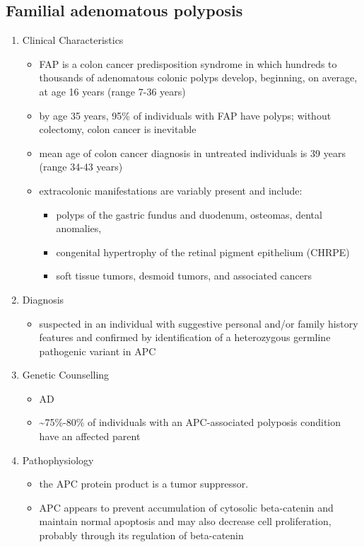 \documentclass[12pt]{scrartcl}
\begin{document}
\subsection{Familial adenomatous polyposis}
\label{sec:orgf2b6979}
\begin{enumerate}
\item Clinical Characteristics
\label{sec:orgc0d2a38}
\begin{itemize}
\item FAP is a colon cancer predisposition syndrome in which hundreds to
thousands of adenomatous colonic polyps develop, beginning, on
average, at age 16 years (range 7-36 years)
\item by age 35 years, 95\% of individuals with FAP have polyps; without
colectomy, colon cancer is inevitable
\item mean age of colon cancer diagnosis in untreated individuals is
39 years (range 34-43 years)
\item extracolonic manifestations are variably present and include:
\begin{itemize}
\item polyps of the gastric fundus and duodenum, osteomas, dental anomalies,
\item congenital hypertrophy of the retinal pigment epithelium (CHRPE)
\item soft tissue tumors, desmoid tumors, and associated cancers
\end{itemize}
\end{itemize}

\item Diagnosis
\label{sec:orgbd2d8e5}
\begin{itemize}
\item suspected in an individual with suggestive personal and/or family
history features and confirmed by identification of a heterozygous
germline pathogenic variant in APC
\end{itemize}

\item Genetic Counselling
\label{sec:orgcd26ec7}
\begin{itemize}
\item AD
\item \textasciitilde{}75\%-80\% of individuals with an APC-associated polyposis condition
have an affected parent
\end{itemize}
\item Pathophysiology
\label{sec:org6c7527b}
\begin{itemize}
\item the APC protein product is a tumor suppressor.
\item APC appears to prevent accumulation of cytosolic beta-catenin and
maintain normal apoptosis and may also decrease cell proliferation,
probably through its regulation of beta-catenin
\end{itemize}
\end{enumerate}
\end{document}
